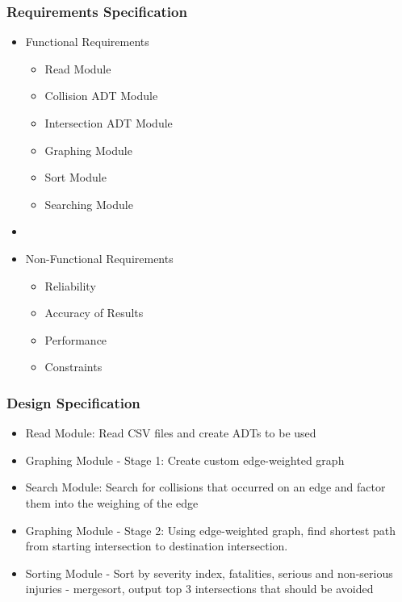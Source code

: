 \documentclass[t,12pt,numbers,fleqn]{beamer}
\begin{document}
\begin{frame}
\frametitle{Requirements Specification}
\begin{itemize}
    \item Functional Requirements
    \begin{itemize}
        \item Read Module
        \item Collision ADT Module
        \item Intersection ADT Module
        \item Graphing Module
        \item Sort Module
        \item Searching Module
    \end{itemize}
    \item[] %
    \item Non-Functional Requirements
    \begin{itemize}
        \item Reliability
        \item Accuracy of Results
        \item Performance
        
        


        \item Constraints
    \end{itemize}
\end{itemize}
\end{frame}
\begin{frame}
\frametitle{Design Specification}
\begin{itemize}
    \item Read Module: Read CSV files and create ADTs to be used
    \item Graphing Module - Stage 1: Create custom edge-weighted graph
    \item Search Module: Search for collisions that occurred on an edge and factor them into the weighing of the edge
    \item Graphing Module - Stage 2: Using edge-weighted graph, find shortest path from starting intersection to destination intersection.
    \item Sorting Module - Sort by severity index, fatalities, serious and non-serious injuries - mergesort, output top 3 intersections that should be avoided
\end{itemize}
\end{frame}
\end{document}
